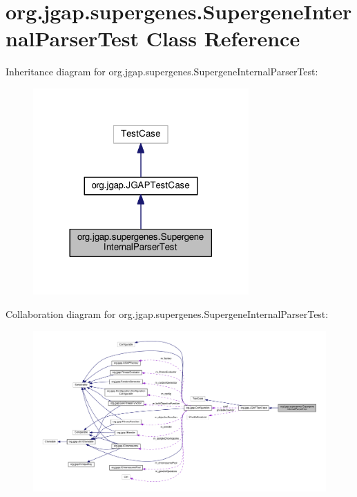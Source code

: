 \hypertarget{classorg_1_1jgap_1_1supergenes_1_1_supergene_internal_parser_test}{\section{org.\-jgap.\-supergenes.\-Supergene\-Internal\-Parser\-Test Class Reference}
\label{classorg_1_1jgap_1_1supergenes_1_1_supergene_internal_parser_test}
}


Inheritance diagram for org.\-jgap.\-supergenes.\-Supergene\-Internal\-Parser\-Test\-:
\nopagebreak
\begin{figure}[H]
\begin{center}
\leavevmode
\includegraphics[width=234pt]{classorg_1_1jgap_1_1supergenes_1_1_supergene_internal_parser_test__inherit__graph}
\end{center}
\end{figure}


Collaboration diagram for org.\-jgap.\-supergenes.\-Supergene\-Internal\-Parser\-Test\-:
\nopagebreak
\begin{figure}[H]
\begin{center}
\leavevmode
\includegraphics[width=350pt]{classorg_1_1jgap_1_1supergenes_1_1_supergene_internal_parser_test__coll__graph}
\end{center}
\end{figure}
